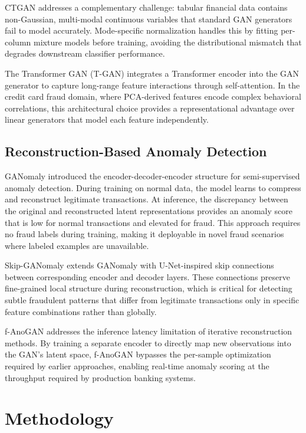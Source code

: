 \documentclass[conference]{IEEEtran}
\begin{document}
CTGAN \cite{ctgan2026} addresses a complementary challenge: tabular financial
data contains non-Gaussian, multi-modal continuous variables that standard
GAN generators fail to model accurately. Mode-specific normalization handles
this by fitting per-column mixture models before training, avoiding the
distributional mismatch that degrades downstream classifier performance.

The Transformer GAN (T-GAN) \cite{tgan2025} integrates a Transformer encoder
into the GAN generator to capture long-range feature interactions through
self-attention. In the credit card fraud domain, where PCA-derived features
encode complex behavioral correlations, this architectural choice provides
a representational advantage over linear generators that model each feature
independently.

\subsection{Reconstruction-Based Anomaly Detection}

GANomaly \cite{akcay2019} introduced the encoder-decoder-encoder structure for
semi-supervised anomaly detection. During training on normal data, the model
learns to compress and reconstruct legitimate transactions. At inference, the
discrepancy between the original and reconstructed latent representations
provides an anomaly score that is low for normal transactions and elevated
for fraud. This approach requires no fraud labels during training, making it
deployable in novel fraud scenarios where labeled examples are unavailable.

Skip-GANomaly \cite{liu2021} extends GANomaly with U-Net-inspired skip
connections between corresponding encoder and decoder layers. These
connections preserve fine-grained local structure during reconstruction,
which is critical for detecting subtle fraudulent patterns that differ from
legitimate transactions only in specific feature combinations rather than
globally.

f-AnoGAN \cite{schlegl2019} addresses the inference latency limitation of
iterative reconstruction methods. By training a separate encoder to directly
map new observations into the GAN's latent space, f-AnoGAN bypasses the
per-sample optimization required by earlier approaches, enabling real-time
anomaly scoring at the throughput required by production banking systems.

\section{Methodology}
\end{document}
